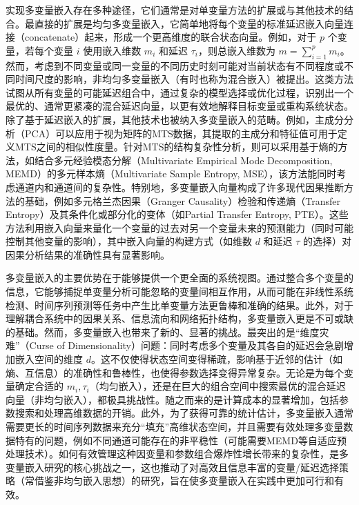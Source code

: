 实现多变量嵌入存在多种途径，它们通常是对单变量方法的扩展或与其他技术的结合。最直接的扩展是均匀多变量嵌入，它简单地将每个变量的标准延迟嵌入向量连接（concatenate）起来，形成一个更高维度的联合状态向量。例如，对于 $p$ 个变量，若每个变量 $i$ 使用嵌入维数 $m_i$ 和延迟 $\tau_i$，则总嵌入维数为 $m = \sum_{i=1}^{p} m_i$。然而，考虑到不同变量或同一变量的不同历史时刻可能对当前状态有不同程度或不同时间尺度的影响，非均匀多变量嵌入（有时也称为混合嵌入）被提出。这类方法试图从所有变量的可能延迟组合中，通过复杂的模型选择或优化过程，识别出一个最优的、通常更紧凑的混合延迟向量，以更有效地解释目标变量或重构系统状态。除了基于延迟嵌入的扩展，其他技术也被纳入多变量嵌入的范畴。例如，主成分分析（PCA）可以应用于视为矩阵的MTS数据，其提取的主成分和特征值可用于定义MTS之间的相似性度量。针对MTS的结构复杂性分析，则可以采用基于熵的方法，如结合多元经验模态分解（Multivariate Empirical Mode Decomposition, MEMD\cite{rehman2010multivariate}）的多元样本熵（Multivariate Sample Entropy, MSE），该方法能同时考虑通道内和通道间的复杂性。特别地，多变量嵌入向量构成了许多现代因果推断方法的基础，例如多元格兰杰因果（Granger Causality）检验和传递熵（Transfer Entropy）及其条件化或部分化的变体（如Partial Transfer Entropy, PTE）。这些方法利用嵌入向量来量化一个变量的过去对另一个变量未来的预测能力（同时可能控制其他变量的影响），其中嵌入向量的构建方式（如维数 $d$ 和延迟 $\tau$ 的选择）对因果分析结果的准确性具有显著影响。

多变量嵌入的主要优势在于能够提供一个更全面的系统视图。通过整合多个变量的信息，它能够捕捉单变量分析可能忽略的变量间相互作用，从而可能在非线性系统检测、时间序列预测等任务中产生比单变量方法更鲁棒和准确的结果。此外，对于理解耦合系统中的因果关系、信息流向和网络拓扑结构，多变量嵌入更是不可或缺的基础。然而，多变量嵌入也带来了新的、显著的挑战。最突出的是“维度灾难”（Curse of Dimensionality）问题：同时考虑多个变量及其各自的延迟会急剧增加嵌入空间的维度 $d$。这不仅使得状态空间变得稀疏，影响基于近邻的估计（如熵、互信息）的准确性和鲁棒性，也使得参数选择变得异常复杂。无论是为每个变量确定合适的 $m_i, \tau_i$（均匀嵌入），还是在巨大的组合空间中搜索最优的混合延迟向量（非均匀嵌入），都极具挑战性。随之而来的是计算成本的显著增加，包括参数搜索和处理高维数据的开销。此外，为了获得可靠的统计估计，多变量嵌入通常需要更长的时间序列数据来充分“填充”高维状态空间，并且需要有效处理多变量数据特有的问题，例如不同通道可能存在的非平稳性（可能需要MEMD等自适应预处理技术）。如何有效管理这种因变量和参数组合爆炸性增长带来的复杂性，是多变量嵌入研究的核心挑战之一，这也推动了对高效且信息丰富的变量/延迟选择策略（常借鉴非均匀嵌入思想）的研究，旨在使多变量嵌入在实践中更加可行和有效。


